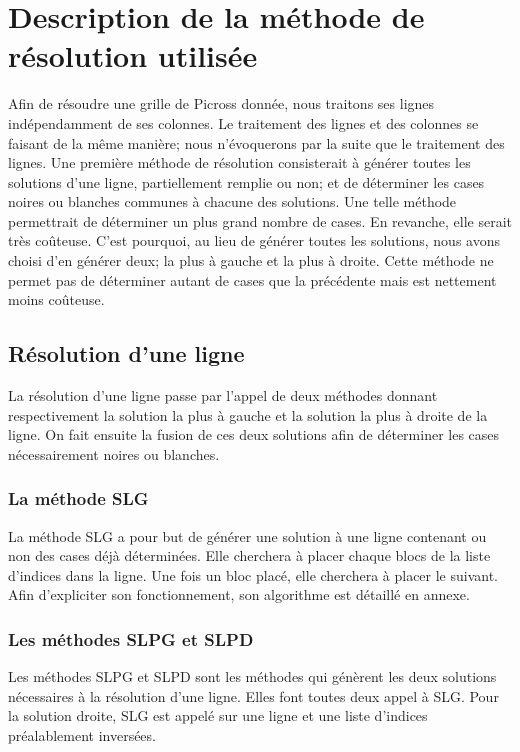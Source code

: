 \documentclass{article}
\begin{document}
\section{Description de la méthode de résolution utilisée}
Afin de résoudre une grille de Picross donnée, nous traitons ses lignes indépendamment de ses colonnes. 
Le traitement des lignes et des colonnes se faisant de la même manière; nous n'évoquerons par la suite que le traitement des lignes.
\newline
Une première méthode de résolution consisterait à générer toutes les solutions d'une ligne, partiellement remplie ou non; et de déterminer les cases noires ou blanches communes à chacune des solutions.
\newline
Une telle méthode permettrait de déterminer un plus grand nombre de cases. En revanche, elle serait très coûteuse.
\newline
C'est pourquoi, au lieu de générer toutes les solutions, nous avons choisi d'en générer deux; la plus à gauche et la plus à droite. Cette méthode ne permet pas de déterminer autant de cases que la précédente mais est nettement moins coûteuse.
\subsection{Résolution d'une ligne}
La résolution d'une ligne passe par l'appel de deux méthodes donnant respectivement la solution la plus à gauche et la solution la plus à droite de la ligne.
\newline
On fait ensuite la fusion de ces deux solutions afin de déterminer les cases nécessairement noires ou blanches.
\subsubsection{La méthode SLG}
La méthode SLG a pour but de générer une solution à une ligne contenant ou non des cases déjà déterminées.
Elle cherchera à placer chaque blocs de la liste d'indices dans la ligne.
Une fois un bloc placé, elle cherchera à placer le suivant.
Afin d'expliciter son fonctionnement, son algorithme est détaillé en annexe.
\subsubsection{Les méthodes SLPG et SLPD}
Les méthodes SLPG et SLPD sont les méthodes qui génèrent les deux solutions nécessaires à la résolution d'une ligne. Elles font toutes deux appel à SLG. 
\newline
Pour la solution droite, SLG est appelé sur une ligne et une liste d'indices préalablement inversées.
\end{document}
